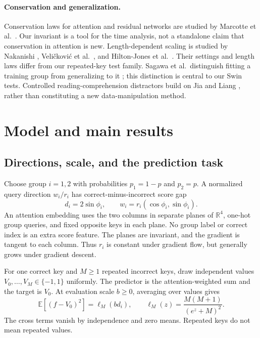 \documentclass[10pt,a4paper]{article}
\newcommand{\E}{\mathbb E}
\newcommand{\R}{\mathbb R}
\begin{document}
\paragraph{Conservation and generalization.}
Conservation laws for attention and residual networks are studied by Marcotte et al.\ \cite{marcotte2025}. Our invariant is a tool for the time analysis, not a standalone claim that conservation in attention is new. Length-dependent scaling is studied by Nakanishi \cite{nakanishi}, Veli\v{c}kovi\'c et al.\ \cite{velickovic2025}, and Hilton-Jones et al.\ \cite{hiltonjones}. Their settings and length laws differ from our repeated-key test family. Sagawa et al.\ distinguish fitting a training group from generalizing to it \cite{sagawa2020}; this distinction is central to our Swin tests. Controlled reading-comprehension distractors build on Jia and Liang \cite{jia2017}, rather than constituting a new data-manipulation method.

\section{Model and main results}\label{sec:theory}
\subsection{Directions, scale, and the prediction task}
Choose group $i=1,2$ with probabilities $p_1=1-p$ and $p_2=p$. A normalized query direction $w_i/r_i$ has correct-minus-incorrect score gap
\begin{equation}
d_i=2\sin\phi_i,\qquad w_i=r_i(\cos\phi_i,\sin\phi_i).
\label{eq:gaps}
\end{equation}
An attention embedding uses the two columns in separate planes of $\R^4$, one-hot group queries, and fixed opposite keys in each plane. No group label or correct index is an extra score feature. The planes are invariant, and the gradient is tangent to each column. Thus $r_i$ is constant under gradient flow, but generally grows under gradient descent.

For one correct key and $M\ge1$ repeated incorrect keys, draw independent values $V_0,\ldots,V_M\in\{-1,1\}$ uniformly. The predictor is the attention-weighted sum and the target is $V_0$. At evaluation scale $b\ge0$, averaging over values gives
\begin{equation}
\E[(f-V_0)^2]=\ell_M(bd_i),\qquad
\ell_M(z)=\frac{M(M+1)}{(e^z+M)^2}.
\label{eq:risk}
\end{equation}
The cross terms vanish by independence and zero means. Repeated keys do not mean repeated values.
\end{document}
